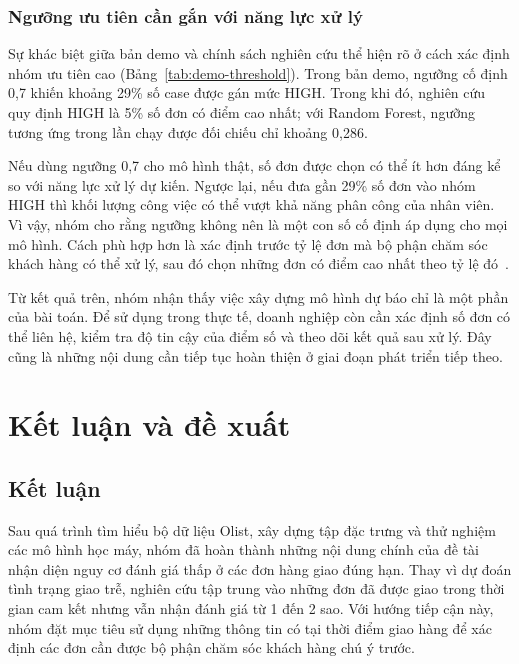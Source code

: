 \documentclass[12pt,a4paper]{report}
\begin{document}
\subsection{Ngưỡng ưu tiên cần gắn với năng lực xử lý}\label{sec:disc-threshold}

Sự khác biệt giữa bản demo và chính sách nghiên cứu thể hiện rõ ở cách xác định nhóm ưu tiên cao (Bảng~\ref{tab:demo-threshold}). Trong bản demo, ngưỡng cố định 0,7 khiến khoảng 29\% số case được gán mức HIGH. Trong khi đó, nghiên cứu quy định HIGH là 5\% số đơn có điểm cao nhất; với Random Forest, ngưỡng tương ứng trong lần chạy được đối chiếu chỉ khoảng 0,286.

Nếu dùng ngưỡng 0,7 cho mô hình thật, số đơn được chọn có thể ít hơn đáng kể so với năng lực xử lý dự kiến. Ngược lại, nếu đưa gần 29\% số đơn vào nhóm HIGH thì khối lượng công việc có thể vượt khả năng phân công của nhân viên. Vì vậy, nhóm cho rằng ngưỡng không nên là một con số cố định áp dụng cho mọi mô hình. Cách phù hợp hơn là xác định trước tỷ lệ đơn mà bộ phận chăm sóc khách hàng có thể xử lý, sau đó chọn những đơn có điểm cao nhất theo tỷ lệ đó~\cite{gomezvargas2025}.

Từ kết quả trên, nhóm nhận thấy việc xây dựng mô hình dự báo chỉ là một phần của bài toán. Để sử dụng trong thực tế, doanh nghiệp còn cần xác định số đơn có thể liên hệ, kiểm tra độ tin cậy của điểm số và theo dõi kết quả sau xử lý. Đây cũng là những nội dung cần tiếp tục hoàn thiện ở giai đoạn phát triển tiếp theo.


\chapter{Kết luận và đề xuất}\label{ch:conclusion}

\section{Kết luận}

Sau quá trình tìm hiểu bộ dữ liệu Olist, xây dựng tập đặc trưng và thử nghiệm các mô hình học máy, nhóm đã hoàn thành những nội dung chính của đề tài nhận diện nguy cơ đánh giá thấp ở các đơn hàng giao đúng hạn. Thay vì dự đoán tình trạng giao trễ, nghiên cứu tập trung vào những đơn đã được giao trong thời gian cam kết nhưng vẫn nhận đánh giá từ 1 đến 2 sao. Với hướng tiếp cận này, nhóm đặt mục tiêu sử dụng những thông tin có tại thời điểm giao hàng để xác định các đơn cần được bộ phận chăm sóc khách hàng chú ý trước.
\end{document}

